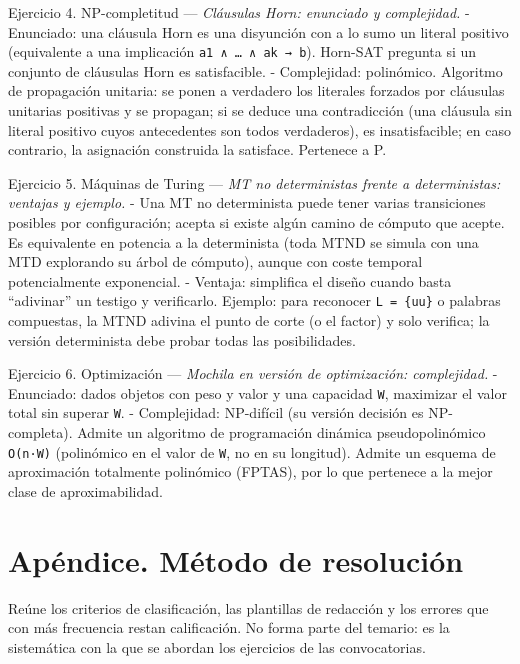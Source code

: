 \documentclass[12pt]{book} %
\begin{document}
Ejercicio 4. NP-completitud --- \emph{Cláusulas Horn: enunciado y
complejidad.} - Enunciado: una cláusula Horn es una disyunción con a lo
sumo un literal positivo (equivalente a una implicación
\texttt{a1\ ∧\ …\ ∧\ ak\ →\ b}). Horn-SAT pregunta si un conjunto de
cláusulas Horn es satisfacible. - Complejidad: polinómico. Algoritmo de
propagación unitaria: se ponen a verdadero los literales forzados por
cláusulas unitarias positivas y se propagan; si se deduce una
contradicción (una cláusula sin literal positivo cuyos antecedentes son
todos verdaderos), es insatisfacible; en caso contrario, la asignación
construida la satisface. Pertenece a P.

Ejercicio 5. Máquinas de Turing --- \emph{MT no deterministas frente a
deterministas: ventajas y ejemplo.} - Una MT no determinista puede tener
varias transiciones posibles por configuración; acepta si existe algún
camino de cómputo que acepte. Es equivalente en potencia a la
determinista (toda MTND se simula con una MTD explorando su árbol de
cómputo), aunque con coste temporal potencialmente exponencial. -
Ventaja: simplifica el diseño cuando basta ``adivinar'' un testigo y
verificarlo. Ejemplo: para reconocer \texttt{L\ =\ \{uu\}} o palabras
compuestas, la MTND adivina el punto de corte (o el factor) y solo
verifica; la versión determinista debe probar todas las posibilidades.

Ejercicio 6. Optimización --- \emph{Mochila en versión de optimización:
complejidad.} - Enunciado: dados objetos con peso y valor y una
capacidad \texttt{W}, maximizar el valor total sin superar \texttt{W}. -
Complejidad: NP-difícil (su versión decisión es NP-completa). Admite un
algoritmo de programación dinámica pseudopolinómico \texttt{O(n·W)}
(polinómico en el valor de \texttt{W}, no en su longitud). Admite un
esquema de aproximación totalmente polinómico (FPTAS), por lo que
pertenece a la mejor clase de aproximabilidad.

\hypertarget{apuxe9ndice.-muxe9todo-de-resoluciuxf3n}{%
\chapter{Apéndice. Método de
resolución}\label{apuxe9ndice.-muxe9todo-de-resoluciuxf3n}}

Reúne los criterios de clasificación, las plantillas de redacción y los
errores que con más frecuencia restan calificación. No forma parte del
temario: es la sistemática con la que se abordan los ejercicios de las
convocatorias.
\end{document}
